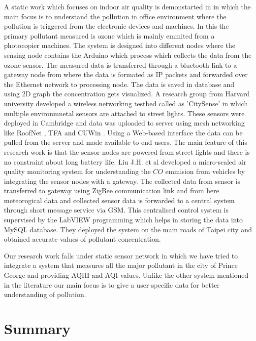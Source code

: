 A static work which focuses on indoor air quality is demonstarted in \cite{Firdhous2017} in which the main focus is to understand the pollution in office environment where the pollution is triggered from the electronic devices and machines. In this the primary pollutant measured is ozone which is mainly emmited from a photocopier machines. The system is designed into different nodes where the sensing node contains the Arduino which process which collects the data from the ozone sensor. The measured data is transferred through a bluetooth link to a gateway node from where the data is formated as IP packets and forwarded over the Ethernet network to processing node. The data is saved in database and using 2D graph the concentration gets visualized. A research group from Harvard university developed a wireless networking testbed called as 'CitySense' \cite{Murty2008} in which multiple environmnetal sensors are attached to street lights. These sensors were deployed in Cambridge and data was uploaded to server using mesh networking like RoofNet \cite{Bicket2005}, TFA \cite{Camp2006} and CUWin \cite{cuwin2006}. Using a Web-based interface the data can be pulled from the server and made available to end users. The main feature of this research work is that the sensor nodes are powered from street lights and there is no constraint about long battery life.
Liu J.H. et al \cite{Liu2011} developed a micro-scaled air quality monitoring system for understanding the $CO$ emmision from vehicles by integrating the sensor nodes with a gateway. The collected data from sensor is transferred to gateway using ZigBee communication link and from here meteorogical data and collected sensor data is forwarded to a central system through short message service via GSM. This centralised control system is supervised by the LabVIEW \cite{INSTRUMENTS2013} programming which helps in storing the data into MySQL database. They deployed the system on the main roads of Taipei city and obtained accurate values of pollutant concentration.

Our research work falls under static sensor network in which we have tried to integrate a system that measures all the major pollutant in the city of Prince George and providing AQHI and AQI values. Unlike the other system mentioned in the literature our main focus is to give a user specific data for better understanding of pollution.

 \section{Summary}